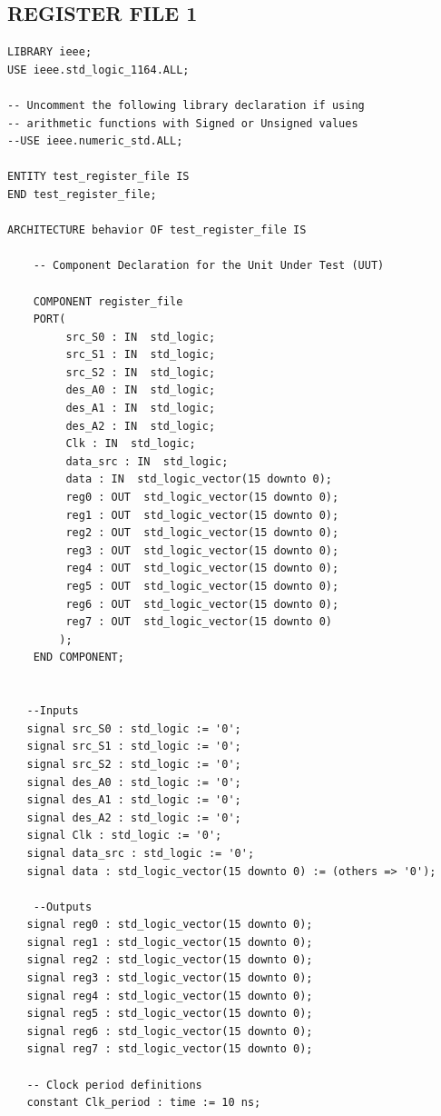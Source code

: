 \documentclass{article}
\begin{document}
\subsection{REGISTER FILE 1}\label{sec:result}

\begin{lstlisting}
LIBRARY ieee;
USE ieee.std_logic_1164.ALL;
 
-- Uncomment the following library declaration if using
-- arithmetic functions with Signed or Unsigned values
--USE ieee.numeric_std.ALL;
 
ENTITY test_register_file IS
END test_register_file;
 
ARCHITECTURE behavior OF test_register_file IS 
 
    -- Component Declaration for the Unit Under Test (UUT)
 
    COMPONENT register_file
    PORT(
         src_S0 : IN  std_logic;
         src_S1 : IN  std_logic;
         src_S2 : IN  std_logic;
         des_A0 : IN  std_logic;
         des_A1 : IN  std_logic;
         des_A2 : IN  std_logic;
         Clk : IN  std_logic;
         data_src : IN  std_logic;
         data : IN  std_logic_vector(15 downto 0);
         reg0 : OUT  std_logic_vector(15 downto 0);
         reg1 : OUT  std_logic_vector(15 downto 0);
         reg2 : OUT  std_logic_vector(15 downto 0);
         reg3 : OUT  std_logic_vector(15 downto 0);
         reg4 : OUT  std_logic_vector(15 downto 0);
         reg5 : OUT  std_logic_vector(15 downto 0);
         reg6 : OUT  std_logic_vector(15 downto 0);
         reg7 : OUT  std_logic_vector(15 downto 0)
        );
    END COMPONENT;
    

   --Inputs
   signal src_S0 : std_logic := '0';
   signal src_S1 : std_logic := '0';
   signal src_S2 : std_logic := '0';
   signal des_A0 : std_logic := '0';
   signal des_A1 : std_logic := '0';
   signal des_A2 : std_logic := '0';
   signal Clk : std_logic := '0';
   signal data_src : std_logic := '0';
   signal data : std_logic_vector(15 downto 0) := (others => '0');

 	--Outputs
   signal reg0 : std_logic_vector(15 downto 0);
   signal reg1 : std_logic_vector(15 downto 0);
   signal reg2 : std_logic_vector(15 downto 0);
   signal reg3 : std_logic_vector(15 downto 0);
   signal reg4 : std_logic_vector(15 downto 0);
   signal reg5 : std_logic_vector(15 downto 0);
   signal reg6 : std_logic_vector(15 downto 0);
   signal reg7 : std_logic_vector(15 downto 0);

   -- Clock period definitions
   constant Clk_period : time := 10 ns;
 

\end{lstlisting}
\end{document}

